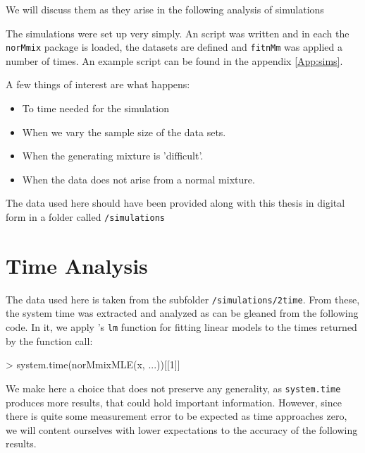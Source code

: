 We will discuss them as they arise in the following analysis of simulations

The simulations were set up very simply. An \Rp script was written and in each
the {\tt norMmix} package is loaded, the datasets are defined and {\tt fitnMm}
was applied a number of times. An example script can be found in the appendix
\ref{App:sims}.

A few things of interest are what happens:
\begin{itemize}
    \item To time needed for the simulation
    \item When we vary the sample size of the data sets.
    \item When the generating mixture is 'difficult'.
    \item When the data does not arise from a normal mixture.
\end{itemize}

The data used here should have been provided along with this thesis in digital 
form in a folder called {\tt /simulations}


\section{Time Analysis}


The data used here is taken from the subfolder {\tt /simulations/2time}.
From these, the system time was extracted and analyzed as can be gleaned from
the following code. In it, we apply \Rp's {\tt lm} function for fitting linear 
models to the times returned by the function call:
\begin{Schunk}
\begin{Sinput}
>     system.time(norMmixMLE(x, ...))[[1]]
\end{Sinput}
\end{Schunk}
We make here a choice that does not preserve any generality, as 
{\tt system.time} produces more results, that could hold important information.
However, since there is quite some measurement error to be expected as time 
approaches zero, we will content ourselves with lower expectations to the 
accuracy of the following results.


